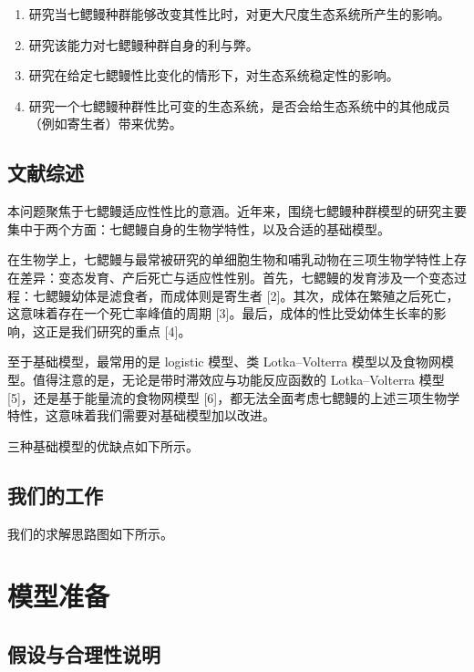 \documentclass[11pt,a4paper]{ctexart}
\begin{document}
\begin{enumerate}
\item 研究当七鳃鳗种群能够改变其性比时，对更大尺度生态系统所产生的影响。
\item 研究该能力对七鳃鳗种群自身的利与弊。
\item 研究在给定七鳃鳗性比变化的情形下，对生态系统稳定性的影响。
\item 研究一个七鳃鳗种群性比可变的生态系统，是否会给生态系统中的其他成员（例如寄生者）带来优势。
\end{enumerate}

\subsection{文献综述}

本问题聚焦于七鳃鳗适应性性比的意涵。近年来，围绕七鳃鳗种群模型的研究主要集中于两个方面：七鳃鳗自身的生物学特性，以及合适的基础模型。

在生物学上，七鳃鳗与最常被研究的单细胞生物和哺乳动物在三项生物学特性上存在差异：变态发育、产后死亡与适应性性别。首先，七鳃鳗的发育涉及一个变态过程：七鳃鳗幼体是滤食者，而成体则是寄生者 [2]。其次，成体在繁殖之后死亡，这意味着存在一个死亡率峰值的周期 [3]。最后，成体的性比受幼体生长率的影响，这正是我们研究的重点 [4]。

至于基础模型，最常用的是 logistic 模型、类 Lotka--Volterra 模型以及食物网模型。值得注意的是，无论是带时滞效应与功能反应函数的 Lotka--Volterra 模型 [5]，还是基于能量流的食物网模型 [6]，都无法全面考虑七鳃鳗的上述三项生物学特性，这意味着我们需要对基础模型加以改进。

三种基础模型的优缺点如下所示。

\subsection{我们的工作}

我们的求解思路图如下所示。

\section{模型准备}

\subsection{假设与合理性说明}
\end{document}
